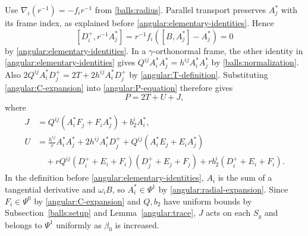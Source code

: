 \documentclass[11pt,a4paper]{article}
\theoremstyle{definition}
\theoremstyle{remark}
\numberwithin{equation}{section}
\begin{document}
Use $\nabla_i(r^{-1})=-f_i r^{-1}$ from \eqref{balls:radius}.
Parallel transport preserves $A_j^*$ with its frame index, as
explained before \eqref{angular:elementary-identities}. Hence
\[
 [D_i^+,r^{-1}A_j^*]=r^{-1}f_i([B,A_j^*]-A_j^*)=0
\]
by \eqref{angular:elementary-identities}.
In a $\gamma$-orthonormal frame, the other identity in
\eqref{angular:elementary-identities} gives
$Q^{ij}A_i^*A_j^*=h^{ij}A_i^*A_j^*$ by \eqref{balls:normalization}.
Also $2Q^{ij}A_i^*D_j^+=2T+2h^{ij}A_i^*D_j^+$ by
\eqref{angular:T-definition}. Substituting \eqref{angular:C-expansion}
into \eqref{angular:P-equation} therefore gives
\begin{equation}\label{angular:P-decomposition}
 P=2T+U+J,
\end{equation}
where
\begin{align*}
 J&=Q^{ij}(A_i^*F_j+F_iA_j^*)+b_2^iA_i^*,\\
 U&=\frac{h^{ij}}{r}A_i^*A_j^*
       +2h^{ij}A_i^*D_j^+
       +Q^{ij}(A_i^*E_j+E_iA_j^*)\\
  &\quad+rQ^{ij}(D_i^++E_i+F_i)(D_j^++E_j+F_j)
       +r b_2^i(D_i^++E_i+F_i).
\end{align*}
In the definition before \eqref{angular:elementary-identities},
$A_i$ is the sum of a tangential derivative and $\omega_i B$, so
$A_i^*\in\Psi^1$ by \eqref{angular:radial-expansion}. Since
$F_i\in\Psi^0$ by \eqref{angular:C-expansion} and $Q,b_2$ have
uniform bounds by Subsection~\ref{balls:setup} and
Lemma~\ref{angular:trace}, $J$ acts on each $S_y$ and belongs to
$\Psi^1$ uniformly as $\beta_0$ is increased.
\end{document}
